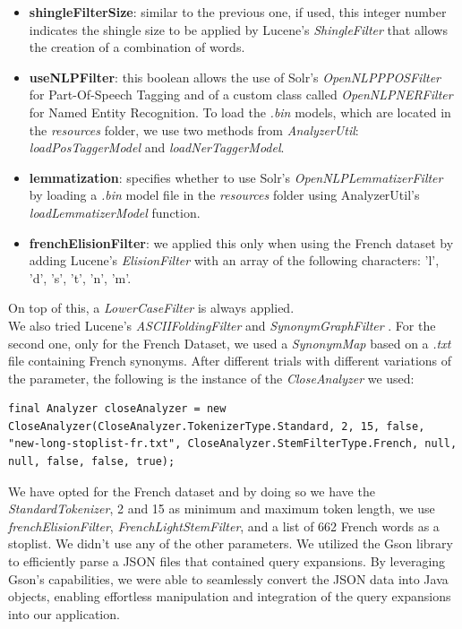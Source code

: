 \begin{itemize}
  \item \textbf{shingleFilterSize}: similar to the previous one, if used, this integer number indicates the shingle size to be applied by Lucene's \textit{ShingleFilter} \cite{luceneshinglefilter} that allows the creation of a combination of words.
  
  \item \textbf{useNLPFilter}: this boolean allows the use of Solr's \cite{solr} \textit{OpenNLPPPOSFilter} \cite{solropennlpposfilter} for Part-Of-Speech Tagging and of a custom class called \textit{OpenNLPNERFilter} for Named Entity Recognition. 
  To load the \textit{.bin} models, which are located in the \textit{resources} folder, we use two methods from \textit{AnalyzerUtil}: \textit{loadPosTaggerModel} and \textit{loadNerTaggerModel}.
  
  \item \textbf{lemmatization}: specifies whether to use Solr's \textit{OpenNLPLemmatizerFilter} \cite{solropennlplemmafilter} by loading a \textit{.bin} model file in the \textit{resources} folder using AnalyzerUtil's \textit{loadLemmatizerModel} function.
  
  \item \textbf{frenchElisionFilter}: we applied this only when using the French dataset by adding Lucene's \textit{ElisionFilter} \cite{luceneelisionfilter} with an array of the following characters: 'l', 'd', 's', 't', 'n', 'm'.
\end{itemize}
On top of this, a \textit{LowerCaseFilter} \cite{lucenelowercasefilter} is always applied. \\
We also tried Lucene's \textit{ASCIIFoldingFilter} \cite{luceneasciifoldingfilter} and \textit{SynonymGraphFilter} \cite{lucenesynonymgraphfilter}. 
For the second one, only for the French Dataset, we used a \textit{SynonymMap} \cite{lucenesynonymmap} based on a \textit{.txt} file containing French synonyms.
\newline
After different trials with different variations of the parameter, the following is the instance of the \textit{CloseAnalyzer} we used:

\begin{lstlisting}
final Analyzer closeAnalyzer = new CloseAnalyzer(CloseAnalyzer.TokenizerType.Standard, 2, 15, false, "new-long-stoplist-fr.txt", CloseAnalyzer.StemFilterType.French, null, null, false, false, true);
\end{lstlisting}
We have opted for the French dataset and by doing so we have the \textit{StandardTokenizer}, 2 and 15 as minimum and maximum token length, we use \textit{frenchElisionFilter}, \textit{FrenchLightStemFilter}, and a list of 662 French words as a stoplist. 
We didn't use any of the other parameters.
We utilized the Gson library to efficiently parse a JSON files that contained query expansions. By leveraging Gson's capabilities, we were able to seamlessly convert the JSON data into Java objects, enabling effortless manipulation and integration of the query expansions into our application.


